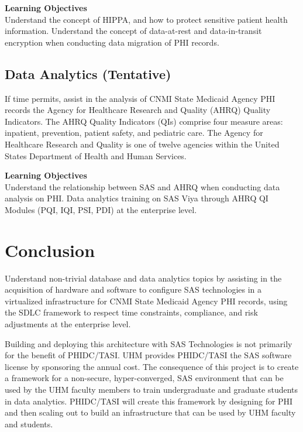 \documentclass[11pt]{article}
\begin{document}
\textbf{Learning Objectives}\\
Understand the concept of HIPPA, and how to protect sensitive patient health information. Understand the concept of data-at-rest and data-in-transit encryption when conducting data migration of PHI records. 

\subsection{Data Analytics (Tentative)}
If time permits, assist in the analysis of CNMI State Medicaid Agency PHI records the Agency for Healthcare Research and Quality (AHRQ) Quality Indicators. The AHRQ Quality Indicators (QIs) comprise four measure areas: inpatient, prevention, patient safety, and pediatric care. The Agency for Healthcare Research and Quality is one of twelve agencies within the United States Department of Health and Human Services.

\textbf{Learning Objectives}\\
Understand the relationship between SAS and AHRQ when conducting data analysis on PHI. Data analytics training on SAS Viya through AHRQ QI Modules (PQI, IQI, PSI, PDI) at the enterprise level. 

\section{Conclusion}
Understand non-trivial database and data analytics topics by assisting in the acquisition of hardware and software to configure SAS technologies in a virtualized infrastructure for CNMI State Medicaid Agency PHI records, using the SDLC framework to respect time constraints, compliance, and risk adjustments at the enterprise level.

Building and deploying this architecture with SAS Technologies is not primarily for the benefit of PHIDC/TASI. UHM provides PHIDC/TASI the SAS software license by sponsoring the annual cost. The consequence of this project is to create a framework for a non-secure, hyper-converged, SAS environment that can be used by the UHM faculty members to train undergraduate and graduate students in data analytics. PHIDC/TASI will create this framework by designing for PHI and then scaling out to build an infrastructure that can be used by UHM faculty and students.
\end{document}
